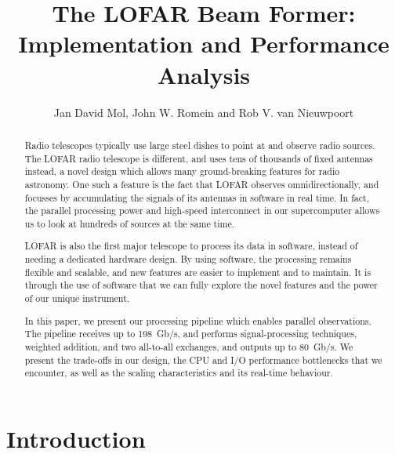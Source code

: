 \documentclass{llncs}
\begin{document}
\newcommand{\comment}[1]{}

\author{Jan David Mol, John W. Romein and Rob V. van Nieuwpoort}
\title{The LOFAR Beam Former: \\ Implementation and Performance Analysis}
\maketitle


\begin{abstract}
Radio telescopes typically use large steel dishes to point at and observe radio sources. The LOFAR radio telescope is different, and uses tens of thousands of fixed antennas instead, a novel design which allows many ground-breaking features for radio astronomy. One such a feature is the fact that LOFAR observes omnidirectionally, and focusses by accumulating the signals of its antennas in software in real time. In fact, the parallel processing power and high-speed interconnect in our supercomputer allows us to look at hundreds of sources at the same time.%

LOFAR is also the first major telescope to process its data in software, instead of needing a dedicated hardware design. By using software, the processing remains flexible and scalable, and new features are easier to implement and to maintain. It is through the use of software that we can fully explore the novel features and the power of our unique instrument.

In this paper, we present our processing pipeline which enables parallel observations. The pipeline receives up to 198~Gb/s, and performs signal-processing techniques, weighted addition, and two all-to-all exchanges, and outputs up to 80~Gb/s. We present the trade-offs in our design, the CPU and I/O performance bottlenecks that we encounter, as well as the scaling characteristics and its real-time behaviour. 
      
\comment{
  
}
\end{abstract}
\section{Introduction}
\end{document}
